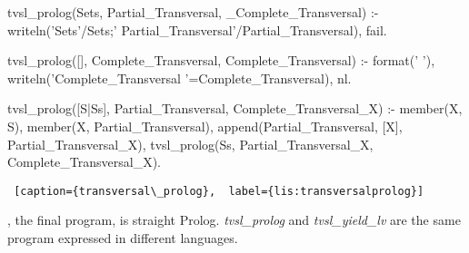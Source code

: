 \begin{minipage}{\linewidth} \largev \hrulefill
\begin{python}[numbers=left]
tvsl_prolog(Sets, Partial_Transversal, _Complete_Transversal) :-
    writeln('Sets'/Sets;'  Partial_Transversal'/Partial_Transversal), 
    fail.

tvsl_prolog([], Complete_Transversal, Complete_Transversal) :-
    format('                                  '),
    writeln('Complete_Transversal '=Complete_Transversal), nl.

tvsl_prolog([S|Ss], Partial_Transversal, Complete_Transversal_X) :-
    member(X, S),
    \+ member(X, Partial_Transversal),
    append(Partial_Transversal, [X], Partial_Transversal_X),
    tvsl_prolog(Ss, Partial_Transversal_X, Complete_Transversal_X).

\end{python}
\begin{lstlisting} [caption={transversal\_prolog},  label={lis:transversalprolog}]
\end{lstlisting}
\end{minipage}

\smallv
{}, the final program, is straight Prolog. \textit{tvsl\_prolog} and \textit{tvsl\_yield\_lv} are the same program expressed in different languages.

